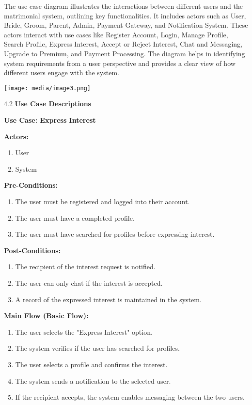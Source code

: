 The use case diagram illustrates the interactions between different
users and the matrimonial system, outlining key functionalities. It
includes actors such as User, Bride, Groom, Parent, Admin, Payment
Gateway, and Notification System. These actors interact with use cases
like Register Account, Login, Manage Profile, Search Profile, Express
Interest, Accept or Reject Interest, Chat and Messaging, Upgrade to
Premium, and Payment Processing. The diagram helps in identifying system
requirements from a user perspective and provides a clear view of how
different users engage with the system.

\texttt{[image: media/image3.png]}

4.2 \textbf{Use Case Descriptions}

\textbf{Use Case: Express Interest}

\textbf{Actors:}

\begin{enumerate}
\def\labelenumi{\arabic{enumi}.}
\item
  User
\item
  System
\end{enumerate}

\textbf{Pre-Conditions:}

\begin{enumerate}
\def\labelenumi{\arabic{enumi}.}
\item
  The user must be registered and logged into their account.
\item
  The user must have a completed profile.
\item
  The user must have searched for profiles before expressing interest.
\end{enumerate}

\textbf{Post-Conditions:}

\begin{enumerate}
\def\labelenumi{\arabic{enumi}.}
\item
  The recipient of the interest request is notified.
\item
  The user can only chat if the interest is accepted.
\item
  A record of the expressed interest is maintained in the system.
\end{enumerate}

\textbf{Main Flow (Basic Flow):}

\begin{enumerate}
\def\labelenumi{\arabic{enumi}.}
\item
  The user selects the "Express Interest" option.
\item
  The system verifies if the user has searched for profiles.
\item
  The user selects a profile and confirms the interest.
\item
  The system sends a notification to the selected user.
\item
  If the recipient accepts, the system enables messaging between the two
  users.
\end{enumerate}

